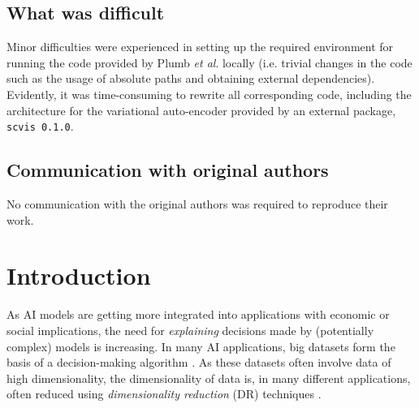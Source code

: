 \subsection*{What was difficult}
Minor difficulties were experienced in setting up the required environment for running the code provided by Plumb \textit{et al}. locally (i.e. trivial changes in the code such as the usage of absolute paths and obtaining external dependencies). Evidently, it was time-consuming to rewrite all corresponding code, including the architecture for the variational auto-encoder provided by an external package, \texttt{scvis 0.1.0}\footnotemark.


\setcounter{footnote}{1}
\setcounter{footnote}{2}

\subsection*{Communication with original authors}
No communication with the original authors was required to reproduce their work.

\section{Introduction}
As AI models are getting more integrated into applications with economic or social implications, the need for \textit{explaining} decisions made by (potentially complex) models is increasing. In many AI applications, big datasets form the basis of a decision-making algorithm \citep{6547979}. As these datasets often involve data of high dimensionality, the dimensionality of data is, in many different applications, often reduced using \textit{dimensionality reduction} (DR) techniques \citep{van2009dimensionality}.\\

